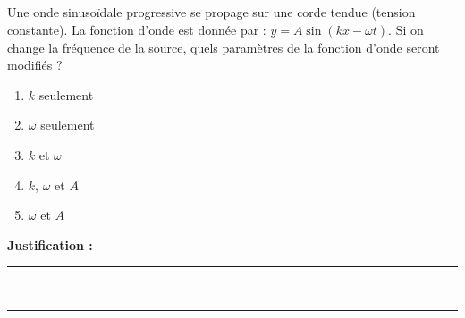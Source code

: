 \subsection{}
Une onde sinusoïdale progressive se propage sur une corde tendue (tension constante). La fonction d'onde est donnée par : $y = A \sin(k x - \omega t)$. Si on change la fréquence de la source, quels paramètres de la fonction d'onde seront modifiés ?

\begin{enumerate}[label=\Alph*)]
    \item $k$ seulement
    \item $\omega$ seulement
    \item $k$ et $\omega$
    \item $k$, $\omega$ et $A$
    \item $\omega$ et $A$
\end{enumerate}

\noindent\textbf{Justification :} \hrulefill \\[2.5ex]
\rule{\linewidth}{0.4pt} \\[2.5ex]
\rule{\linewidth}{0.4pt}
\vfill